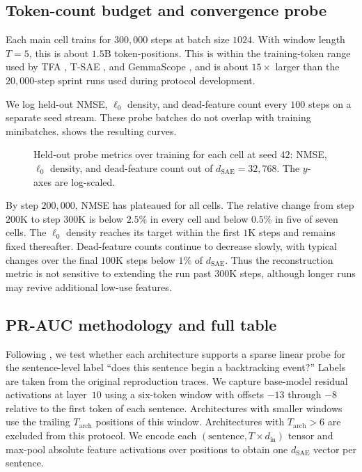 
\subsection{Token-count budget and convergence probe}
\label{app:c7-token-budget}

Each main cell trains for $300{,}000$ steps at batch size $1024$. With window length $T=5$, this is about $1.5$B token-positions. This is within the training-token range used by TFA \cite{lubana2025priors}, T-SAE \cite{bhalla2025tsae}, and GemmaScope \cite{lieberum2024gemmascope}, and is about $15\times$ larger than the $20{,}000$-step sprint runs used during protocol development.

We log held-out NMSE, $\ell_0$ density, and dead-feature count every $100$ steps on a separate seed stream. These probe batches do not overlap with training minibatches.  shows the resulting curves.

\begin{figure}[t]
    \centering
    \caption{Held-out probe metrics over training for each cell at seed $42$: NMSE, $\ell_0$ density, and dead-feature count out of $d_{\text{SAE}}=32{,}768$. The $y$-axes are log-scaled.}
    \label{fig:c7-probe-curves}
\end{figure}

By step $200{,}000$, NMSE has plateaued for all cells. The relative change from step $200\mathrm{K}$ to step $300\mathrm{K}$ is below $2.5\%$ in every cell and below $0.5\%$ in five of seven cells. The $\ell_0$ density reaches its target within the first $1\mathrm{K}$ steps and remains fixed thereafter. Dead-feature counts continue to decrease slowly, with typical changes over the final $100\mathrm{K}$ steps below $1\%$ of $d_{\text{SAE}}$. Thus the reconstruction metric is not sensitive to extending the run past $300\mathrm{K}$ steps, although longer runs may revive additional low-use features.

\subsection{PR-AUC methodology and full table}
\label{app:c7-pr-auc-full}

Following \citet{kantamneni2025probing}, we test whether each architecture supports a sparse linear probe for the sentence-level label ``does this sentence begin a backtracking event?'' Labels are taken from the original reproduction traces. We capture base-model residual activations at layer~$10$ using a six-token window with offsets $-13$ through $-8$ relative to the first token of each sentence. Architectures with smaller windows use the trailing $T_{\text{arch}}$ positions of this window. Architectures with $T_{\text{arch}}>6$ are excluded from this protocol. We encode each $(\text{sentence}, T \times d_{\text{in}})$ tensor and max-pool absolute feature activations over positions to obtain one $d_{\text{SAE}}$ vector per sentence.

